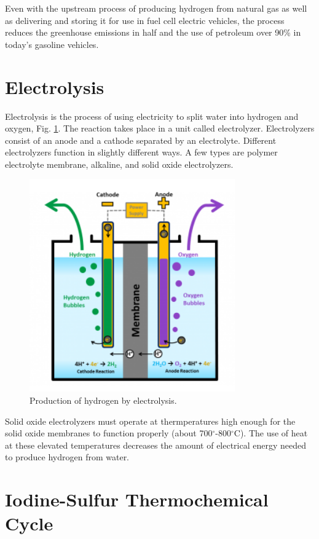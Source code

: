 Even with the upstream process of producing hydrogen from natural gas as well as delivering and storing it for use in fuel cell electric vehicles, the process reduces the greenhouse emissions in half and the use of petroleum over 90\% in today's gasoline vehicles.

\section{Electrolysis}

Electrolysis is the process of using electricity to split water into hydrogen and oxygen, Fig. \ref{fig:electro}. The reaction takes place in a unit called electrolyzer. Electrolyzers consist of an anode and a cathode separated by an electrolyte. Different electrolyzers function in slightly different ways. A few types are polymer electrolyte membrane, alkaline, and solid oxide electrolyzers.

\begin{figure}[H]
	\centering
	\includegraphics[width=0.4\linewidth]{figures/electrolysis.png}
	\hfill
	\caption{Production of hydrogen by electrolysis.}
	\label{fig:electro}
\end{figure}

Solid oxide electrolyzers must operate at thermperatures high enough for the solid oxide membranes to function properly (about 700$^{\circ}$-800$^{\circ}$C). The use of heat at these elevated temperatures decreases the amount of electrical energy needed to produce hydrogen from water.

\section{Iodine-Sulfur Thermochemical Cycle}

